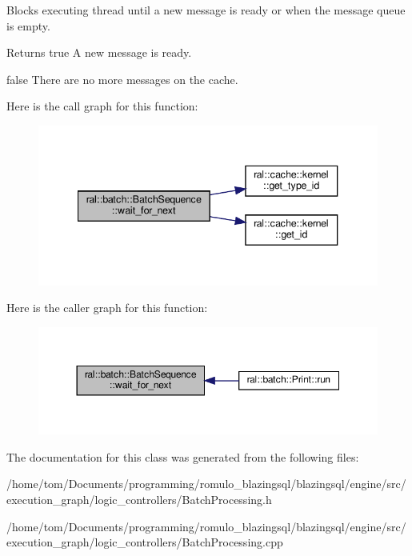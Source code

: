 Blocks executing thread until a new message is ready or when the message queue is empty. \begin{DoxyReturn}{Returns}
true A new message is ready. 

false There are no more messages on the cache. 
\end{DoxyReturn}
Here is the call graph for this function\+:\nopagebreak
\begin{figure}[H]
\begin{center}
\leavevmode
\includegraphics[width=340pt]{classral_1_1batch_1_1BatchSequence_af62f1f620ac02a018737af8a89eb4881_cgraph}
\end{center}
\end{figure}
Here is the caller graph for this function\+:\nopagebreak
\begin{figure}[H]
\begin{center}
\leavevmode
\includegraphics[width=350pt]{classral_1_1batch_1_1BatchSequence_af62f1f620ac02a018737af8a89eb4881_icgraph}
\end{center}
\end{figure}


The documentation for this class was generated from the following files\+:\begin{DoxyCompactItemize}
\item 
/home/tom/\+Documents/programming/romulo\+\_\+blazingsql/blazingsql/engine/src/execution\+\_\+graph/logic\+\_\+controllers/Batch\+Processing.\+h\item 
/home/tom/\+Documents/programming/romulo\+\_\+blazingsql/blazingsql/engine/src/execution\+\_\+graph/logic\+\_\+controllers/Batch\+Processing.\+cpp\end{DoxyCompactItemize}
